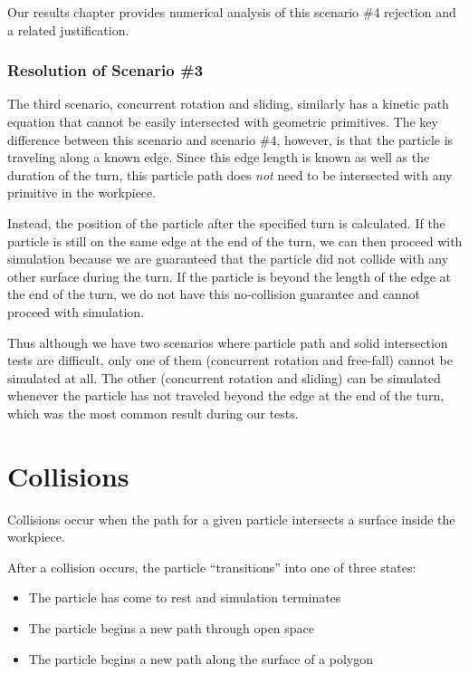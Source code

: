 Our results chapter provides numerical analysis of this scenario \#4 rejection and a related justification.

		\subsubsection{Resolution of Scenario \#3}

The third scenario, concurrent rotation and sliding, similarly has a kinetic path equation that cannot be easily intersected with geometric primitives. The key difference between this scenario and scenario \#4, however, is that the particle is traveling along a known edge. Since this edge length is known as well as the duration of the turn, this particle path does \emph{not} need to be intersected with any primitive in the workpiece.

Instead, the position of the particle after the specified turn is calculated. If the particle is still on the same edge at the end of the turn, we can then proceed with simulation because we are guaranteed that the particle did not collide with any other surface during the turn. If the particle is beyond the length of the edge at the end of the turn, we do not have this no-collision guarantee and cannot proceed with simulation.

Thus although we have two scenarios where particle path and solid intersection tests are difficult, only one of them (concurrent rotation and free-fall) cannot be simulated at all. The other (concurrent rotation and sliding) can be simulated whenever the particle has not traveled beyond the edge at the end of the turn, which was the most common result during our tests.

	\section{Collisions}

Collisions occur when the path for a given particle intersects a surface inside the workpiece.


After a collision occurs, the particle ``transitions'' into one of three states:

\begin{itemize}
\item The particle has come to rest and simulation terminates
\item The particle begins a new path through open space
\item The particle begins a new path along the surface of a polygon
\end{itemize}

